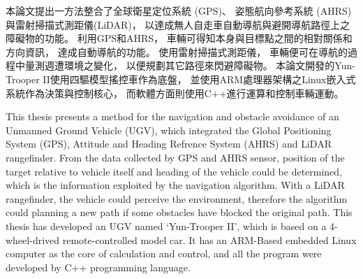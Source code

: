 \begin{abstractzh}
本論文提出一方法整合了全球衛星定位系統 (GPS)、
姿態航向參考系統 (AHRS)
與雷射掃描式測距儀(LiDAR)，
以達成無人自走車自動導航與避開導航路徑上之障礙物的功能。
利用GPS和AHRS，
車輛可得知本身與目標點之間的相對關係和方向資訊，
達成自動導航的功能。
使用雷射掃描式測距儀，
車輛便可在導航的過程中量測週遭環境之變化，
以便規劃其它路徑來閃避障礙物。
本論文開發的Yun-Trooper II使用四驅模型搖控車作為底盤，
並使用ARM處理器架構之Linux嵌入式系統作為決策與控制核心，
而軟體方面則使用C++進行運算和控制車輛運動。


\end{abstractzh}

\begin{abstracten}
This thesis presents a method for the navigation and obstacle avoidance 
of an Unmanned Ground Vehicle (UGV), which integrated the
Global Positioning System (GPS), 
Attitude and Heading Refrence System (AHRS) and
LiDAR rangefinder.
From the data collected by GPS and AHRS sensor, position of the target relative
to vehicle itself and heading of the vehicle could be determined,
which is the information exploited by the navigation algorithm.
With a LiDAR rangefinder, the vehicle could perceive the environment, therefore
the algorithm could planning a new path if some obstacles have blocked the original path.
This thesis has developed an UGV named `Yun-Trooper \nolinebreak II', which is based on a 4-wheel-drived
remote-controlled model car. It has an ARM-Based embedded Linux computer as
the core of calculation and control, and all the program were developed by C++ programming
language.


\end{abstracten}